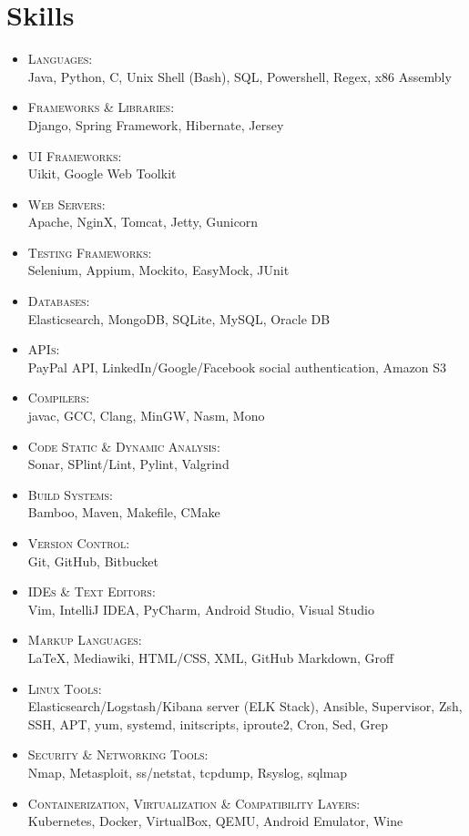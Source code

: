 \documentclass[a4paper,10pt]{article}
\begin{document}
\section{Skills}
\begin{itemize}
\item \textsc{Languages}:\\
	Java, Python, C, Unix Shell (Bash), SQL, Powershell, Regex, x86 Assembly
\item \textsc{Frameworks \& Libraries}:\\
	Django, Spring Framework, Hibernate, Jersey
\item \textsc{UI Frameworks}:\\
	Uikit, Google Web Toolkit
\item \textsc{Web Servers}:\\
	Apache, NginX, Tomcat, Jetty, Gunicorn
\item \textsc{Testing Frameworks}:\\
	Selenium, Appium, Mockito, EasyMock, JUnit
\item \textsc{Databases}:\\
	Elasticsearch, MongoDB, SQLite, MySQL, Oracle DB
\item \textsc{APIs}:\\
	PayPal API, LinkedIn/Google/Facebook social authentication, Amazon S3
\item \textsc{Compilers}:\\
	javac, GCC, Clang, MinGW, Nasm, Mono
\item \textsc{Code Static \& Dynamic Analysis}:\\
	Sonar, SPlint/Lint, Pylint, Valgrind
\item \textsc{Build Systems}:\\
	Bamboo, Maven, Makefile, CMake
\item \textsc{Version Control}:\\
	Git, GitHub, Bitbucket
\item \textsc{IDEs \& Text Editors}:\\
	Vim, IntelliJ IDEA, PyCharm, Android Studio, Visual Studio
\item \textsc{Markup Languages}:\\
	\LaTeX, Mediawiki, HTML/CSS, XML, GitHub Markdown, Groff
\item \textsc{Linux Tools}:\\
	Elasticsearch/Logstash/Kibana server (ELK Stack), Ansible, Supervisor, Zsh, SSH, APT, yum, systemd, initscripts, iproute2, Cron, Sed, Grep
\item \textsc{Security \& Networking Tools}:\\
	Nmap, Metasploit, ss/netstat, tcpdump, Rsyslog, sqlmap
\item \textsc{Containerization, Virtualization \& Compatibility Layers}:\\
	Kubernetes, Docker, VirtualBox, QEMU, Android Emulator, Wine
\end{itemize}
\end{document}

